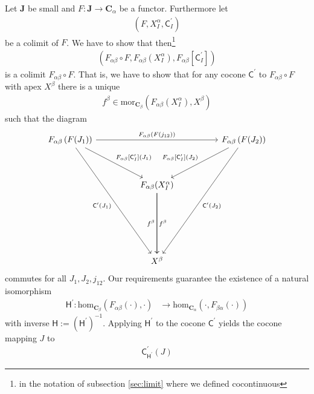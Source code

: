 \begin{prf}
Let $\mathbf{J}$ be small and $F \colon \mathbf{J} \rightarrow \mathbf{C}_{\alpha}$ be a functor. Furthermore let
\begin{align*}
  \left(
    F,
    X_{I}^{\alpha},
    \mathsf{C}_{I}^{\prime}
  \right)
\end{align*}
be a colimit of $F$. We have to show that then\footnote{in the notation of subsection \ref{sec:limit} where we defined cocontinuous}
\begin{align*}
  \left(
    F_{\alpha\beta} \circ F,
    F_{\alpha\beta}(X_{I}^{\alpha}),
    F_{\alpha\beta}[\mathsf{C}_{I}^{\prime}]
  \right)
\end{align*}
is a colimit $F_{\alpha\beta} \circ F$. That is, we have to show that for any cocone $\mathsf{C}^{\prime}$ to $F_{\alpha\beta} \circ F$ with apex $X^{\beta}$ there is a unique
\begin{align*}
  f^{\beta}
  \in
  \mathrm{mor}_{\mathbf{C}_{\beta}}
  \left(
    F_{\alpha\beta}(X_{I}^{\alpha}),
    X^{\beta}
  \right)
\end{align*}
such that the diagram
\[
\begin{tikzcd}[sep=huge]
  F_{\alpha\beta}
  \left(
    F(J_{1})
  \right)
  \arrow{rr}{F_{\alpha\beta}(F(j_{12}))}
  \arrow{dr}{F_{\alpha\beta}[\mathsf{C}_{I}^{\prime}](J_{1})}
  \arrow[swap]{dddr}{\mathsf{C}^{\prime}(J_{1})}
  &
  &
  F_{\alpha\beta}
  \left(
    F(J_{2})
  \right)
  \arrow{dddl}{\mathsf{C}^{\prime}(J_{2})}
  \arrow[swap]{dl}{F_{\alpha\beta}[\mathsf{C}_{I}^{\prime}](J_{2})}
  \\
  &
  F_{\alpha\beta}(X_{I}^{\alpha})
  \arrow{dd}{f^{\beta}}
  \arrow[swap]{dd}{f^{\beta}}
  &
  \\
  \\
  &
  X^{\beta}
  &
\end{tikzcd}
\]
commutes for all $J_{1},J_{2},j_{12}$. Our requirements guarantee the existence of a natural isomorphism
\begin{align*}
  \mathsf{H}^{\prime}
  \colon
  \mathrm{hom}_{\mathbf{C}_{\beta}}
  \left(
    F_{\alpha\beta}(\cdot),
    \cdot
  \right)
  &\rightarrow
  \mathrm{hom}_{\mathbf{C}_{\alpha}}
  \left(
    \cdot,
    F_{\beta\alpha}(\cdot)
  \right)
\end{align*}
with inverse $\mathsf{H} := (\mathsf{H}^{\prime})^{-1}$. Applying $\mathsf{H}^{\prime}$ to the cocone $\mathsf{C}^{\prime}$ yields the cocone mapping $J$ to
\begin{align*}
  \mathsf{C}_{\mathsf{H}^{\prime}}^{\prime}(J)

\end{align*}
\end{prf}
